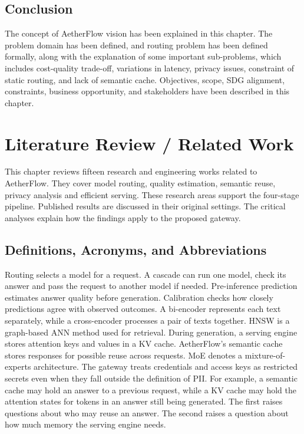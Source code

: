 \documentclass{FastFyp}
\begin{document}
\section{Conclusion}
\label{sec:ch2-conclusion}

The concept of AetherFlow vision has been explained in this chapter. The problem domain has been defined, and routing problem has been defined formally, along with the explanation of some important sub-problems, which includes cost-quality trade-off, variations in latency, privacy issues, constraint of static routing, and lack of semantic cache. Objectives, scope, SDG alignment, constraints, business opportunity, and stakeholders have been described in this chapter.
\chapter{Literature Review / Related Work}
\label{ch:literature}

This chapter reviews fifteen research and engineering works related to AetherFlow. They cover model routing, quality estimation, semantic reuse, privacy analysis and efficient serving. These research areas support the four-stage pipeline. Published results are discussed in their original settings. The critical analyses explain how the findings apply to the proposed gateway.

\section{Definitions, Acronyms, and Abbreviations}
Routing selects a model for a request. A cascade can run one model, check its answer and pass the request to another model if needed. Pre-inference prediction estimates answer quality before generation. Calibration checks how closely predictions agree with observed outcomes. A bi-encoder represents each text separately, while a cross-encoder processes a pair of texts together. HNSW is a graph-based ANN method used for retrieval. During generation, a serving engine stores attention keys and values in a KV cache. AetherFlow's semantic cache stores responses for possible reuse across requests. MoE denotes a mixture-of-experts architecture. The gateway treats credentials and access keys as restricted secrets even when they fall outside the definition of PII. For example, a semantic cache may hold an answer to a previous request, while a KV cache may hold the attention states for tokens in an answer still being generated. The first raises questions about who may reuse an answer. The second raises a question about how much memory the serving engine needs.
\end{document}
